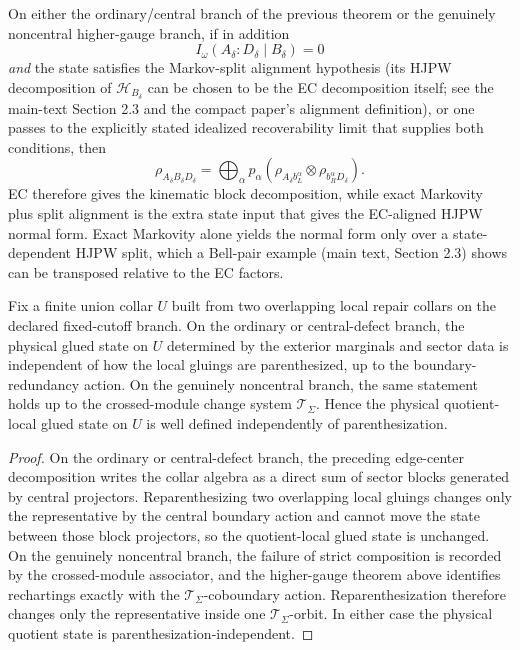 \begin{corollary}
On either the ordinary/central branch of the previous theorem or the genuinely noncentral
higher-gauge branch, if in addition
\[
I_\omega(A_\delta:D_\delta\mid B_\delta)=0
\]
\emph{and} the state satisfies the Markov-split alignment hypothesis (its HJPW decomposition of
\(\mathcal H_{B_\delta}\) can be chosen to be the EC decomposition itself; see the main-text
Section 2.3 and the compact paper's alignment definition), or one passes to the explicitly stated
idealized recoverability limit that supplies both conditions, then
\[
\rho_{A_\delta B_\delta D_\delta}
=
\bigoplus_\alpha p_\alpha
\left(\rho_{A_\delta b_L^\alpha}\otimes \rho_{b_R^\alpha D_\delta}\right).
\]
EC therefore gives the kinematic block decomposition, while exact Markovity plus split alignment
is the extra state input that gives the EC-aligned HJPW normal form. Exact Markovity alone yields
the normal form only over a state-dependent HJPW split, which a Bell-pair example (main text,
Section 2.3) shows can be transposed relative to the EC factors.
\end{corollary}

\begin{proposition}\label{prop:assocglue}
Fix a finite union collar \(U\) built from two overlapping local repair collars on the declared
fixed-cutoff branch. On the ordinary or central-defect branch, the physical glued state on \(U\)
determined by the exterior marginals and sector data is independent of how the local gluings are
parenthesized, up to the boundary-redundancy action. On the genuinely noncentral branch, the same
statement holds up to the crossed-module change system \(\mathcal T_\Sigma\). Hence the physical
quotient-local glued state on \(U\) is well defined independently of parenthesization.
\end{proposition}

\begin{proof}
On the ordinary or central-defect branch, the preceding edge-center decomposition writes the
collar algebra as a direct sum of sector blocks generated by central projectors. Reparenthesizing
two overlapping local gluings changes only the representative by the central boundary action and
cannot move the state between those block projectors, so the quotient-local glued state is
unchanged. On the genuinely noncentral branch, the failure of strict composition is recorded by
the crossed-module associator, and the higher-gauge theorem above identifies rechartings exactly
with the \(\mathcal T_\Sigma\)-coboundary action. Reparenthesization therefore changes only the
representative inside one \(\mathcal T_\Sigma\)-orbit. In either case the physical quotient state
is parenthesization-independent.
\end{proof}

